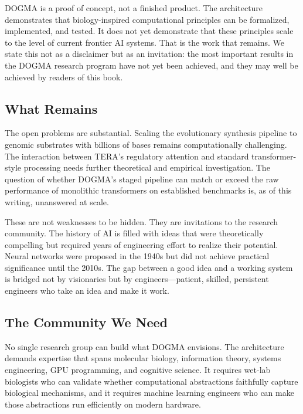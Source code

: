 \begin{keyinsight}
DOGMA is a proof of concept, not a finished product. The architecture demonstrates that biology-inspired computational principles can be formalized, implemented, and tested. It does not yet demonstrate that these principles scale to the level of current frontier AI systems. That is the work that remains. We state this not as a disclaimer but as an invitation: the most important results in the DOGMA research program have not yet been achieved, and they may well be achieved by readers of this book.
\end{keyinsight}

\subsection{What Remains}

The open problems are substantial. Scaling the evolutionary synthesis pipeline to genomic substrates with billions of bases remains computationally challenging. The interaction between TERA's regulatory attention and standard transformer-style processing needs further theoretical and empirical investigation. The question of whether DOGMA's staged pipeline can match or exceed the raw performance of monolithic transformers on established benchmarks is, as of this writing, unanswered at scale.

These are not weaknesses to be hidden. They are invitations to the research community. The history of AI is filled with ideas that were theoretically compelling but required years of engineering effort to realize their potential. Neural networks were proposed in the 1940s but did not achieve practical significance until the 2010s. The gap between a good idea and a working system is bridged not by visionaries but by engineers---patient, skilled, persistent engineers who take an idea and make it work.

\subsection{The Community We Need}

No single research group can build what DOGMA envisions. The architecture demands expertise that spans molecular biology, information theory, systems engineering, GPU programming, and cognitive science. It requires wet-lab biologists who can validate whether computational abstractions faithfully capture biological mechanisms, and it requires machine learning engineers who can make those abstractions run efficiently on modern hardware.


